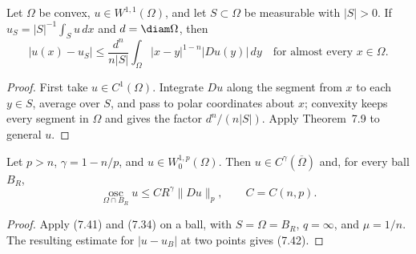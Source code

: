 \begin{lemma}
\label{gt:lem-sobolev-convex-average-estimate}
Let $\Omega$ be convex, $u\in W^{1,1}(\Omega)$, and let
$S\subset\Omega$ be measurable with $|S|>0$. If
$u_S=|S|^{-1}\int_Su\,dx$ and $d=\diam\Omega$, then
\begin{equation}
\tag{7.41}
|u(x)-u_S|\leq\frac{d^n}{n|S|}
\int_\Omega |x-y|^{1-n}|Du(y)|\,dy
\quad\text{for almost every }x\in\Omega.
\end{equation}
\end{lemma}
\begin{proof}
\sketch First take $u\in C^1(\Omega)$. Integrate $Du$ along the segment from
$x$ to each $y\in S$, average over $S$, and pass to polar coordinates about
$x$; convexity keeps every segment in $\Omega$ and gives the factor
$d^n/(n|S|)$. Apply Theorem~7.9 to general $u$.
\end{proof}

\begin{theorem}
\label{gt:thm-sobolev-morrey}
Let $p>n$, $\gamma=1-n/p$, and $u\in W_0^{1,p}(\Omega)$. Then
$u\in C^\gamma(\overline\Omega)$ and, for every ball $B_R$,
\begin{equation}
\tag{7.42}
\operatorname*{osc}_{\Omega\cap B_R}u
\leq C R^\gamma\|Du\|_p,
\qquad C=C(n,p).
\end{equation}
\end{theorem}
\begin{proof}
\sketch Apply (7.41) and (7.34) on a ball, with
$S=\Omega=B_R$, $q=\infty$, and $\mu=1/n$. The resulting estimate for
$|u-u_B|$ at two points gives (7.42).
\end{proof}

